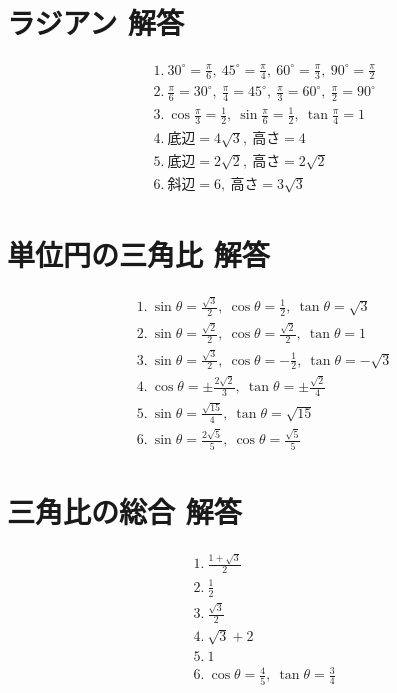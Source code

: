 \documentclass[paper=b4j,landscape,twocolumn,fleqn]{jlreq}
\begin{document}
\newpage
\section{ラジアン 解答}
\begin{align*}
&1.\ 30^\circ=\frac\pi6,\ 45^\circ=\frac\pi4,\ 60^\circ=\frac\pi3,\ 90^\circ=\frac\pi2\\[0.45em]
&2.\ \frac\pi6=30^\circ,\ \frac\pi4=45^\circ,\ \frac\pi3=60^\circ,\ \frac\pi2=90^\circ\\[0.45em]
&3.\ \cos\frac\pi3=\frac12,\ \sin\frac\pi6=\frac12,\ \tan\frac\pi4=1\\[0.45em]
&4.\ \text{底辺}=4\sqrt3,\ \text{高さ}=4\\[0.45em]
&5.\ \text{底辺}=2\sqrt2,\ \text{高さ}=2\sqrt2\\[0.45em]
&6.\ \text{斜辺}=6,\ \text{高さ}=3\sqrt3
\end{align*}

\section{単位円の三角比 解答}
\begin{align*}
&1.\ \sin\theta=\frac{\sqrt3}{2},\ \cos\theta=\frac12,\ \tan\theta=\sqrt3\\[0.45em]
&2.\ \sin\theta=\frac{\sqrt2}{2},\ \cos\theta=\frac{\sqrt2}{2},\ \tan\theta=1\\[0.45em]
&3.\ \sin\theta=\frac{\sqrt3}{2},\ \cos\theta=-\frac12,\ \tan\theta=-\sqrt3\\[0.45em]
&4.\ \cos\theta=\pm\frac{2\sqrt2}{3},\ \tan\theta=\pm\frac{\sqrt2}{4}\\[0.45em]
&5.\ \sin\theta=\frac{\sqrt{15}}{4},\ \tan\theta=\sqrt{15}\\[0.45em]
&6.\ \sin\theta=\frac{2\sqrt5}{5},\ \cos\theta=\frac{\sqrt5}{5}
\end{align*}

\section{三角比の総合 解答}
\begin{align*}
&1.\ \frac{1+\sqrt3}{2}\\[0.45em]
&2.\ \frac12\\[0.45em]
&3.\ \frac{\sqrt3}{2}\\[0.45em]
&4.\ \sqrt3+2\\[0.45em]
&5.\ 1\\[0.45em]
&6.\ \cos\theta=\frac45,\ \tan\theta=\frac34
\end{align*}
\end{document}
